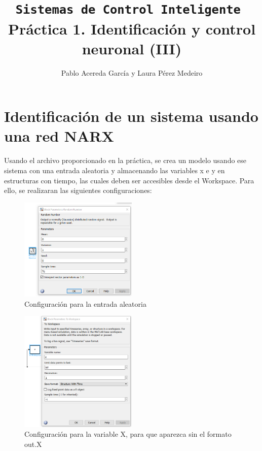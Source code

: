 \documentclass{article}
\title{\texttt{Sistemas de Control Inteligente \newline} Práctica 1. Identificación y control neuronal (III)}
\author{Pablo Acereda García y Laura Pérez Medeiro}
\begin{document}
\maketitle

\section{Identificación de un sistema usando una red NARX}

Usando el archivo proporcionado en la práctica, se crea un modelo usando ese sistema con una entrada aleatoria y almacenando las variables x e y en estructuras con tiempo, las cuales deben ser accesibles desde el Workspace. Para ello, se realizaran las siguientes configuraciones:


\begin{figure}[h]
\caption{Configuración para la entrada aleatoria}
\centering
\includegraphics[width=0.5\textwidth]{imagenes/randomNumConf.png}
\end{figure}

\begin{figure}[h]
\caption{Configuración para la variable X, para que aparezca sin el formato out.X}
\centering
\includegraphics[width=0.5\textwidth]{imagenes/VarX.png}
\end{figure}
\end{document}
